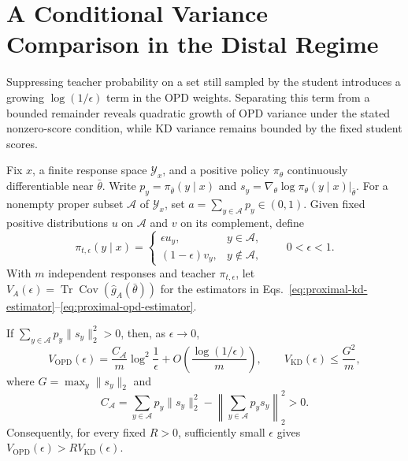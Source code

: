 \section{A Conditional Variance Comparison in the Distal Regime}
\label{app:distal-gradient-variance}

\begin{insight}
Suppressing teacher probability on a set still sampled by the student
introduces a growing $\log(1/\epsilon)$ term in the OPD weights.
Separating this term from a bounded remainder reveals quadratic growth
of OPD variance under the stated nonzero-score condition, while KD variance
remains bounded by the fixed student scores.
\end{insight}

Fix $x$, a finite response space $\mathcal Y_x$, and a positive policy
$\pi_\theta$ continuously differentiable near $\bar\theta$. Write
$p_y=\pi_{\bar\theta}(y\mid x)$ and
$s_y=\nabla_\theta\log\pi_\theta(y\mid x)|_{\bar\theta}$.
For a nonempty proper subset $\mathcal A$ of $\mathcal Y_x$, set
$a=\sum_{y\in\mathcal A}p_y\in(0,1)$. Given fixed positive distributions
$u$ on $\mathcal A$ and $v$ on its complement, define
\begin{equation}
 \pi_{t,\epsilon}(y\mid x)=
 \begin{cases}
   \epsilon u_y,&y\in\mathcal A,\\
   (1-\epsilon)v_y,&y\notin\mathcal A,
 \end{cases}
 \qquad 0<\epsilon<1.
 \label{eq:distal-teacher-family}
\end{equation}
With $m$ independent responses and teacher $\pi_{t,\epsilon}$, let
$V_A(\epsilon)=\operatorname{Tr}\operatorname{Cov}(\widehat g_A(\bar\theta))$
for the estimators in
Eqs.~\eqref{eq:proximal-kd-estimator}--\eqref{eq:proximal-opd-estimator}.

\begin{lemma}
\label{lem:distal-gradient-variance}
If $\sum_{y\in\mathcal A}p_y\|s_y\|_2^2>0$, then, as $\epsilon\to0$,
\begin{equation}
 V_{\mathrm{OPD}}(\epsilon)
 =\frac{C_{\mathcal A}}m\log^2\frac1\epsilon
       +O\!\left(\frac{\log(1/\epsilon)}m\right),
 \qquad V_{\mathrm{KD}}(\epsilon)\le\frac{G^2}{m},
 \label{eq:distal-variance-growth}
\end{equation}
where $G=\max_y\|s_y\|_2$ and
\begin{equation}
 C_{\mathcal A}
 =\sum_{y\in\mathcal A}p_y\|s_y\|_2^2
       -\left\|\sum_{y\in\mathcal A}p_ys_y\right\|_2^2>0.
 \label{eq:distal-variance-coefficient}
\end{equation}
Consequently, for every fixed $R>0$, sufficiently small $\epsilon$
gives $V_{\mathrm{OPD}}(\epsilon)>R V_{\mathrm{KD}}(\epsilon)$.
\end{lemma}


